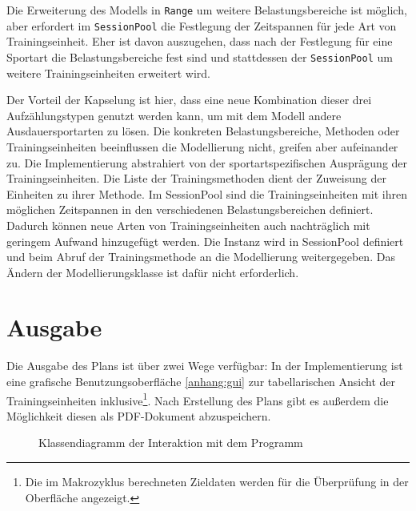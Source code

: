 Die Erweiterung des Modells in \texttt{Range} um weitere Belastungsbereiche ist möglich, aber erfordert im \texttt{SessionPool} die Festlegung der Zeitspannen für jede Art von Trainingseinheit. Eher ist davon auszugehen, dass nach der Festlegung für eine Sportart die Belastungsbereiche fest sind und stattdessen der \texttt{SessionPool} um weitere Trainingseinheiten erweitert wird. \par
Der Vorteil der Kapselung ist hier, dass eine neue Kombination dieser drei Aufzählungstypen genutzt werden kann, um mit dem Modell andere Ausdauersportarten zu lösen. Die konkreten Belastungsbereiche, Methoden oder Trainingseinheiten beeinflussen die Modellierung nicht, greifen aber aufeinander zu. Die Implementierung abstrahiert von der sportartspezifischen Ausprägung der Trainingseinheiten. Die Liste der Trainingsmethoden dient der Zuweisung der Einheiten zu ihrer Methode. Im SessionPool sind die Trainingseinheiten mit ihren möglichen Zeitspannen in den verschiedenen Belastungsbereichen definiert. Dadurch können neue Arten von Trainingseinheiten auch nachträglich mit geringem Aufwand hinzugefügt werden. Die Instanz wird in SessionPool definiert und beim Abruf der Trainingsmethode an die Modellierung weitergegeben. Das Ändern der Modellierungsklasse ist dafür nicht erforderlich.

\section{Ausgabe}
\label{sec:modellierung:output}
Die Ausgabe des Plans ist über zwei Wege verfügbar: In der Implementierung ist eine grafische Benutzungsoberfläche \ref{anhang:gui} zur tabellarischen Ansicht der Trainingseinheiten inklusive\footnote{Die im Makrozyklus berechneten Zieldaten werden für die Überprüfung in der Oberfläche angezeigt.}. Nach Erstellung des Plans gibt es außerdem die Möglichkeit diesen als PDF-Dokument abzuspeichern.

\begin{figure}[h]
    \caption{Klassendiagramm der Interaktion mit dem Programm}
    \label{fig:uml:solver}
\end{figure}

